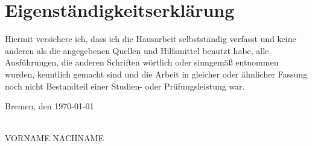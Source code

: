 \newpage



\printbibliography
\newpage
%

\section*{Eigenständigkeitserklärung}


Hiermit versichere ich, dass ich die Hausarbeit selbstständig verfasst und keine anderen als die angegebenen Quellen und Hilfsmittel benutzt habe, alle Ausführungen, die anderen Schriften wörtlich oder sinngemäß entnommen wurden, kenntlich gemacht sind und die Arbeit in gleicher oder ähnlicher Fassung noch nicht Bestandteil einer Studien- oder Prüfungsleistung war.

\vspace{100mm}
\noindent{}Bremen, den \today
\begin{minipage}[t]{8cm}
\centering \hspace{20mm} \hrulefill \\
\hspace{20mm}VORNAME NACHNAME
\end{minipage}